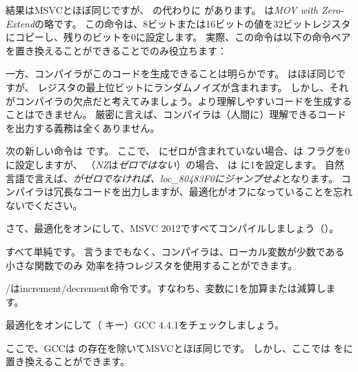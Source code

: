 \label{movzx}

結果はMSVCとほぼ同じですが、 \MOVSX の代わりに \MOVZX があります。 
\MOVZX は\emph{MOV with Zero-Extend}の略です。
この命令は、8ビットまたは16ビットの値を32ビットレジスタにコピーし、残りのビットを0に設定します。
実際、この命令は以下の命令ペアを置き換えることができることでのみ役立ちます：

一方、コンパイラがこのコードを生成できることは明らかです。
 はほぼ同じですが、
\EAX レジスタの最上位ビットにランダムノイズが含まれます。
しかし、それがコンパイラの欠点だと考えてみましょう。より理解しやすいコードを生成することはできません。
厳密に言えば、コンパイラは（人間に）理解できるコードを出力する義務は全くありません。


次の新しい命令は \SETNZ です。
ここで、 \AL にゼロが含まれていない場合、は \ZF フラグを0に設定しますが、
（\emph{NZ}は\emph{ゼロではない}）の場合、 \SETNZ は \AL に1を設定します。
自然言語で言えば、\emph{\AL がゼロでなければ、loc\_80483F0にジャンプせよ}となります。
コンパイラは冗長なコードを出力しますが、最適化がオフになっていることを忘れないでください。

\label{strlen_MSVC_Ox}

さて、最適化をオンにして、MSVC 2012ですべてコンパイルしましょう（\Ox）。



すべて単純です。
言うまでもなく、コンパイラは、ローカル変数が少数である小さな関数でのみ
効率を持つレジスタを使用することができます。

\INC/\DEC は\gls{increment}/\gls{decrement}命令です。すなわち、変数に1を加算または減算します。




最適化をオンにして（ \Othree キー）GCC 4.4.1をチェックしましょう。


 
ここで、GCCは \MOVZX の存在を除いてMSVCとほぼ同じです。 
しかし、ここでは \MOVZX をに置き換えることができます。

